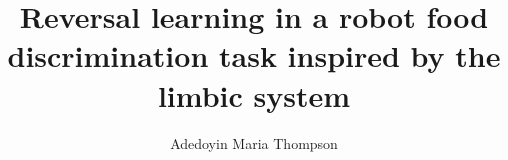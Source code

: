 \documentclass[12pt]{article}
\begin{document}
\pagestyle{headings}

\def\im#1{{\mathrm{Im}(#1)}}
\def\re#1{{\mathrm{Re}(#1)}}



\title{Reversal learning in a robot food discrimination task inspired by the limbic system}

\author{Adedoyin Maria Thompson }



\maketitle
\end{document}
